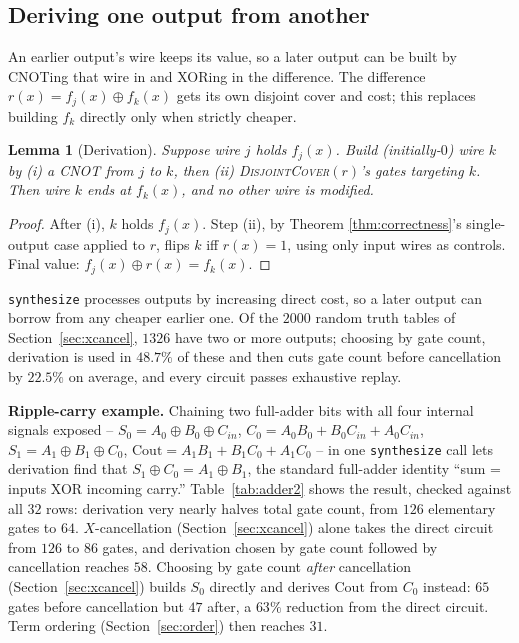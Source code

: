 \documentclass[conference]{IEEEtran}
\newcommand{\code}[1]{\texttt{#1}}
\newcommand{\Algo}[1]{\textup{\textsc{#1}}}
\theoremstyle{plain}
\newtheorem{lemma}{Lemma}
\begin{document}
\subsection{Deriving one output from another}
An earlier output's wire keeps its value, so a later output can be built
by CNOTing that wire in and XORing in the difference. The difference
$r(x)=f_j(x)\oplus f_k(x)$ gets its own disjoint cover and cost; this
replaces building $f_k$ directly only when strictly cheaper.

\begin{lemma}[Derivation]
\label{lem:derive}
Suppose wire $j$ holds $f_j(x)$. Build (initially-$0$) wire $k$ by (i) a
CNOT from $j$ to $k$, then (ii) \Algo{DisjointCover}$(r)$'s gates targeting
$k$. Then wire $k$ ends at $f_k(x)$, and no other wire is modified.
\end{lemma}
\begin{proof}
After (i), $k$ holds $f_j(x)$. Step (ii), by Theorem
\ref{thm:correctness}'s single-output case applied to $r$, flips $k$ iff
$r(x)=1$, using only input wires as controls. Final value:
$f_j(x)\oplus r(x) = f_k(x)$.
\end{proof}

\code{synthesize} processes outputs by increasing direct cost, so a later
output can borrow from any cheaper earlier one. Of the $2000$ random truth
tables of Section~\ref{sec:xcancel}, $1326$ have two or more outputs;
choosing by gate count, derivation is used in $48.7\%$ of these and then
cuts gate count before cancellation by $22.5\%$ on average, and every
circuit passes exhaustive replay.

\textbf{Ripple-carry example.} Chaining two full-adder bits with all four
internal signals exposed --
$S_0=A_0{\oplus}B_0{\oplus}C_{in}$, $C_0=A_0B_0{+}B_0C_{in}{+}A_0C_{in}$,
$S_1=A_1{\oplus}B_1{\oplus}C_0$, $\mathrm{Cout}=A_1B_1{+}B_1C_0{+}A_1C_0$
-- in one \code{synthesize} call lets derivation find that
$S_1\oplus C_0=A_1\oplus B_1$, the standard full-adder identity
``sum = inputs XOR incoming carry.'' Table~\ref{tab:adder2} shows the result,
checked against all $32$ rows: derivation very nearly halves total gate
count, from $126$ elementary gates to $64$. $X$-cancellation
(Section~\ref{sec:xcancel}) alone takes the direct circuit from $126$ to
$86$ gates, and derivation chosen by gate count followed by cancellation
reaches $58$. Choosing by gate count \emph{after} cancellation
(Section~\ref{sec:xcancel}) builds $S_0$ directly and derives
$\mathrm{Cout}$ from $C_0$ instead: $65$ gates before cancellation but
$47$ after, a $63\%$ reduction from the direct circuit. Term ordering
(Section~\ref{sec:order}) then reaches $31$.
\end{document}

